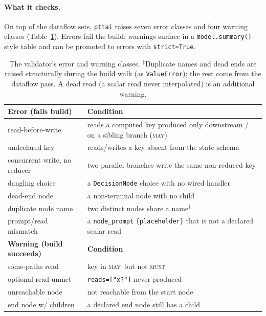 \documentclass[11pt]{article}
\newcommand{\may}{\textsc{may}}
\newcommand{\must}{\textsc{must}}
\newcommand{\code}[1]{\texttt{#1}}
\begin{document}
\paragraph{What it checks.} On top of the dataflow sets, \code{pttai} raises
seven error classes and four warning classes (Table~\ref{tab:checks}). Errors
fail the build; warnings surface in a \code{model.summary()}-style table and can
be promoted to errors with \code{strict=True}.

\begin{table}[t]
  \centering
  \small
  \begin{tabular}{@{}p{}p{}@{}}
    \toprule
    \textbf{Error (fails build)} & \textbf{Condition} \\
    \midrule
    read-before-write & reads a computed key produced only downstream / on a
    sibling branch (\may) \\
    undeclared key & reads/writes a key absent from the state schema \\
    concurrent write, no reducer & two parallel branches write the same
    non-reduced key \\
    dangling choice & a \code{DecisionNode} choice with no wired handler \\
    dead-end node & a non-terminal node with no child \\
    duplicate node name & two distinct nodes share a name$^\dagger$ \\
    prompt/read mismatch & a \code{node\_prompt} \code{\{placeholder\}} that is
    not a declared scalar read \\
    \midrule
    \textbf{Warning (build succeeds)} & \textbf{Condition} \\
    \midrule
    some-paths read & key in \may\ but not \must \\
    optional read unmet & \code{reads=["x?"]} never produced \\
    unreachable node & not reachable from the start node \\
    end node w/ children & a declared end node still has a child \\
    \bottomrule
  \end{tabular}
  \caption{The validator's error and warning classes. $^\dagger$Duplicate names
  and dead ends are raised structurally during the build walk (as
  \code{ValueError}); the rest come from the dataflow pass. A dead read (a scalar
  read never interpolated) is an additional warning.}
  \label{tab:checks}
\end{table}
\end{document}
